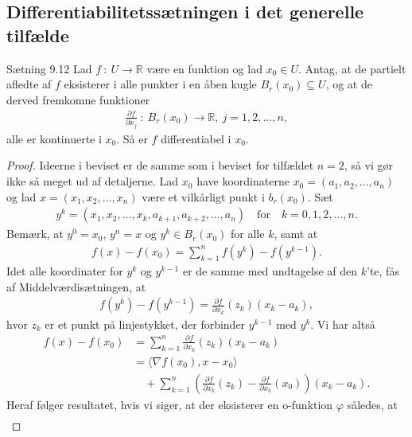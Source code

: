 \subsection{Differentiabilitetssætningen i det generelle tilfælde}
\begin{boks}{Sætning 9.12}
  Lad $f \ : \ U \rightarrow \mathbb{R}$ være en funktion og lad $x_0 \in U$. Antag, at de partielt afledte af $f$ eksisterer i alle punkter i en åben kugle $B_r(x_0) \subseteq U$, og at de derved fremkomne funktioner
  \begin{align*}
    \frac{\partial f}{\partial x_j} \ : \ B_r(x_0) \rightarrow \mathbb{R}, \
    j = 1,2,\ldots,n,
  \end{align*}
  alle er kontinuerte i $x_0$. Så er $f$ differentiabel i $x_0$.
\end{boks}
\begin{proof}
  Ideerne i beviset er de samme som i beviset for tilfældet $n = 2$, så vi gør ikke så meget ud af detaljerne. Lad $x_0$ have koordinaterne $x_0 = (a_1, a_2, \ldots, a_n)$ og lad $x = (x_1, x_2, \ldots, x_n)$ være et vilkårligt punkt i $b_r(x_0)$. Sæt
  \begin{align*}
    y^k = (x_1, x_2, \ldots, x_k, a_{k + 1}, a_{k + 2}, \ldots, a_n)
    \quad \text{for} \quad k = 0, 1, 2, \ldots, n.
  \end{align*}
  Bemærk, at $y^0 = x_0$, $y^n = x$ og $y^k \in B_r(x_0)$ for alle $k$, samt at
  \begin{align*}
    f(x) - f(x_0) = \sum_{k = 1}^n f(y^k) - f(y^{k - 1}).
  \end{align*}
  Idet alle koordinater for $y^k$ og $y^{k - 1}$ er de samme med undtagelse af den $k$'te, fås af Middelværdisætningen, at
  \begin{align*}
    f(y^k) - f(y^{k - 1}) = \frac{\partial f}{\partial x_k}(z_k)(x_k - a_k),
  \end{align*}
  hvor $z_k$ er et punkt på linjestykket, der forbinder $y^{k - 1}$ med $y^k$. Vi har altså
  \begin{align*}
    f(x) - f(x_0) &= \sum_{k = 1}^n \frac{\partial f}{\partial x_k}(z_k)(x_k - a_k) \\
    &= \langle \nabla f(x_0), x - x_0 \rangle\\
    &\quad + \sum_{k = 1}^n \left( \frac{\partial f}{\partial x_k}(z_k) - \frac{\partial f}{\partial x_k}(x_0) \right) (x_k - a_k).
   \end{align*}
   Heraf følger resultatet, hvis vi siger, at der eksisterer en o-funktion $\varphi$ således, at
   \begin{align*}

\end{align*}
\end{proof}

